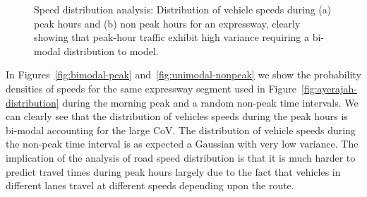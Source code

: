 \documentclass[conference]{IEEEtran}
\begin{document}
\begin{figure}[!tb]
	\centering
	\hfill%
	\label{fig:speed-distributions}
	\caption{Speed distribution analysis: Distribution of vehicle speeds during (a) peak hours and (b) non peak hours for an expressway, clearly showing that peak-hour traffic exhibit high variance requiring a bi-modal distribution to model.}
\end{figure} 

In Figures~\ref{fig:bimodal-peak} and~\ref{fig:unimodal-nonpeak} we show the probability densities of speeds for the same expressway segment used in Figure~\ref{fig:ayerajah-distribution} during the morning peak and a random non-peak time intervals. We can clearly see that the distribution of vehicles speeds during the peak hours is bi-modal accounting for the large \ac{CoV}. The distribution of vehicle speeds during the non-peak time interval is as expected a Gaussian with very low variance. The implication of the analysis of road speed distribution is that it is much harder to predict travel times during peak hours largely due to the fact that vehicles in different lanes travel at different speeds depending upon the route.
\end{document}
